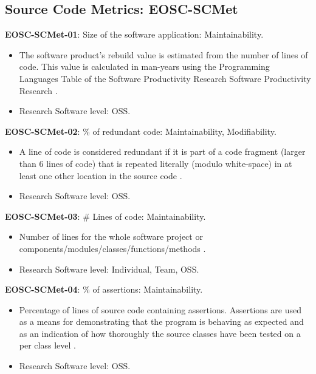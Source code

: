 \subsection{Source Code Metrics: EOSC-SCMet}

\textbf{EOSC-SCMet-01}: Size of the software application: Maintainability.

\begin{itemize}
    \item The software product's rebuild value is estimated from the number of lines of code. This value is calculated in man-years using the  Programming Languages Table of the Software Productivity Research Software Productivity Research \cite{baggen_standardized_2012}.
    \item Research Software level: OSS.
\end{itemize}

\textbf{EOSC-SCMet-02}: \% of redundant code: Maintainability, Modifiability.

\begin{itemize}
    \item A line of code is considered redundant if it is part of a code fragment (larger than 6 lines of code) that is repeated literally (modulo  white-space) in at least one other location in the source code \cite{baggen_standardized_2012}.
    \item Research Software level: OSS.
\end{itemize}

\textbf{EOSC-SCMet-03}: \# Lines of code: Maintainability.

\begin{itemize}
    \item Number of lines for the whole software project or components/modules/classes/functions/methods \cite{montagud_systematic_2012,baggen_standardized_2012}.
    \item Research Software level: Individual, Team, OSS.
\end{itemize}

\textbf{EOSC-SCMet-04}: \% of assertions: Maintainability.

\begin{itemize}
    \item Percentage of lines of source code containing assertions. Assertions are used as a means for demonstrating that the program is behaving as expected and as an indication of how thoroughly the source classes have been tested on a per class level \cite{nagappan_early_2005}.
    \item Research Software level: OSS.
\end{itemize}

